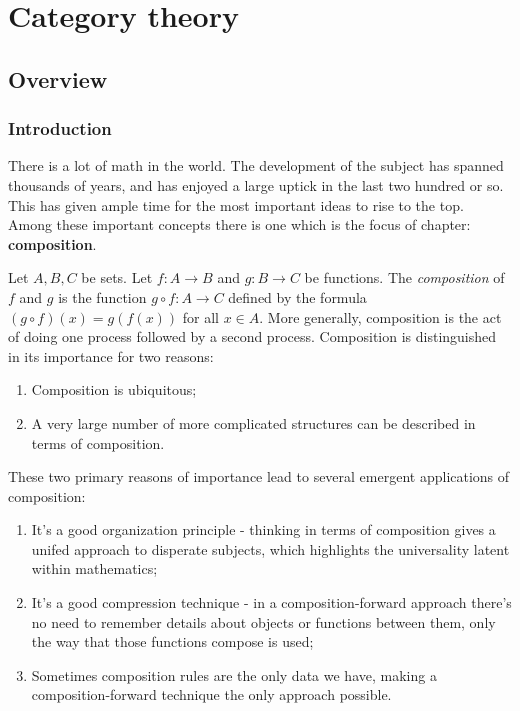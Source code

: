 \section{Category theory}
\label{Category theory}

\subsection{Overview}

\subsubsection{Introduction}

There is a lot of math in the world. The development of the subject has spanned thousands of years, and has enjoyed a large uptick in the last two hundred or so. This has given ample time for the most important ideas to rise to the top. Among these important concepts there is one which is the focus of chapter: \textbf{composition}.

Let $A,B,C$ be sets. Let $f:A\to B$ and $g:B\to C$ be functions. The \textit{composition} of $f$ and $g$ is the function $g\circ f: A\to C$ defined by the formula $(g\circ f)(x)=g(f(x))$ for all $x\in A$. More generally, composition is the act of doing one process followed by a second process. Composition is distinguished in its importance for two reasons:

\begin{enumerate}
\item Composition is ubiquitous;
\item A very large number of more complicated structures can be described in terms of composition.
\end{enumerate}

These two primary reasons of importance lead to several emergent applications of composition:

\begin{enumerate}
\item It's a good organization principle - thinking in terms of composition gives a unifed approach to disperate subjects, which highlights the universality latent within mathematics;
\item It's a good compression technique - in a composition-forward approach there's no need to remember details about objects or functions between them, only the way that those functions compose is used;
\item Sometimes composition rules are the only data we have, making a composition-forward technique the only approach possible.
\end{enumerate}

